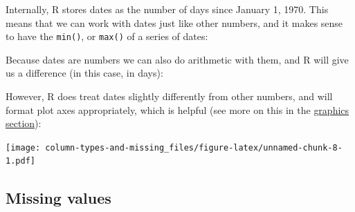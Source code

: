 \documentclass[]{article}
\newenvironment{Shaded}{\begin{snugshade}}{\end{snugshade}}
\newcommand{\KeywordTok}[1]{\textcolor[rgb]{0.13,0.29,0.53}{\textbf{#1}}}
\newcommand{\DataTypeTok}[1]{\textcolor[rgb]{0.13,0.29,0.53}{#1}}
\newcommand{\DecValTok}[1]{\textcolor[rgb]{0.00,0.00,0.81}{#1}}
\newcommand{\StringTok}[1]{\textcolor[rgb]{0.31,0.60,0.02}{#1}}
\newcommand{\CommentTok}[1]{\textcolor[rgb]{0.56,0.35,0.01}{\textit{#1}}}
\newcommand{\OperatorTok}[1]{\textcolor[rgb]{0.81,0.36,0.00}{\textbf{#1}}}
\newcommand{\NormalTok}[1]{#1}
\theoremstyle{definition}
\theoremstyle{definition}
\theoremstyle{definition}
\theoremstyle{remark}
\begin{document}
Internally, R stores dates as the number of days since January 1, 1970.
This means that we can work with dates just like other numbers, and it
makes sense to have the \texttt{min()}, or \texttt{max()} of a series of
dates:

\begin{Shaded}
\end{Shaded}

Because dates are numbers we can also do arithmetic with them, and R
will give us a difference (in this case, in days):

\begin{Shaded}
\end{Shaded}

However, R does treat dates slightly differently from other numbers, and
will format plot axes appropriately, which is helpful (see more on this
in the \protect\hyperlink{graphics}{graphics section}):

\begin{Shaded}
\end{Shaded}

\texttt{[image: column-types-and-missing\_files/figure-latex/unnamed-chunk-8-1.pdf]}

\hypertarget{missing}{\subsection*{Missing values}\label{missing}}
\end{document}
